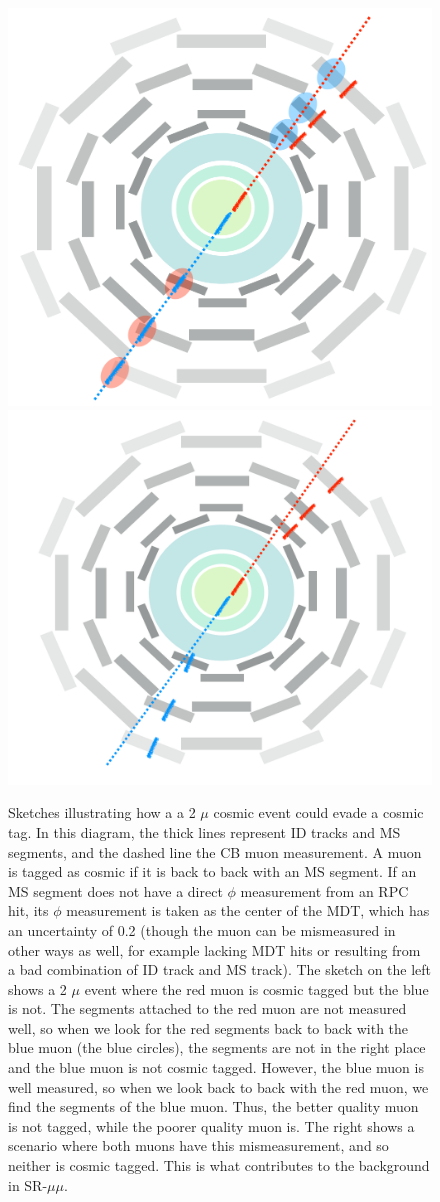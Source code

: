 \begin{figure}[htbp]
\centering
\includegraphics[width=.4\textwidth]{figures/cosmics/1badcos.png}
\includegraphics[width=.45\textwidth]{figures/cosmics/2badcos.png}
\caption{Sketches illustrating how a a 2 $\mu$ cosmic event could evade a cosmic tag. In this diagram, the thick lines represent ID tracks and MS segments, and the dashed line the CB muon measurement. A muon is tagged as cosmic if it is back to back with an MS segment. If an MS segment does not have a direct $\phi$ measurement from an RPC hit, its $\phi$ measurement is taken as the center of the MDT, which has an uncertainty of 0.2 (though the muon can be mismeasured in other ways as well, for example lacking MDT hits or resulting from a bad combination of ID track and MS track). The sketch on the left shows a 2 $\mu$ event where the red muon is cosmic tagged but the blue is not. The segments attached to the red muon are not measured well, so when we look for the red segments back to back with the blue muon (the blue circles), the segments are not in the right place and the blue muon is not cosmic tagged. However, the blue muon is well measured, so when we look back to back with the red  muon, we find the segments of the blue muon. Thus, the better quality muon is not tagged, while the poorer quality muon is. The right shows a scenario where both muons have this mismeasurement, and so neither is cosmic tagged. This is what contributes to the background in SR-$\mu\mu$.}
\label{fig:cosmic_mismeasure}
\end{figure}


